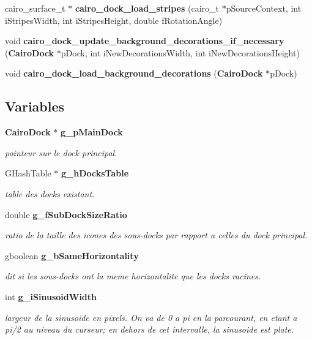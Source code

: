 \begin{CompactItemize}
\item 
cairo\_\-surface\_\-t $\ast$ {\bf cairo\_\-dock\_\-load\_\-stripes} (cairo\_\-t $\ast$p\-Source\-Context, int i\-Stripes\-Width, int i\-Stripes\-Height, double f\-Rotation\-Angle)
\item 
void {\bf cairo\_\-dock\_\-update\_\-background\_\-decorations\_\-if\_\-necessary} ({\bf Cairo\-Dock} $\ast$p\-Dock, int i\-New\-Decorations\-Width, int i\-New\-Decorations\-Height)
\item 
void {\bf cairo\_\-dock\_\-load\_\-background\_\-decorations} ({\bf Cairo\-Dock} $\ast$p\-Dock)
\end{CompactItemize}
\subsection*{Variables}
\begin{CompactItemize}
\item 
{\bf Cairo\-Dock} $\ast$ {\bf g\_\-p\-Main\-Dock}
\begin{CompactList}\small\item\em pointeur sur le dock principal. \item\end{CompactList}\item 
GHash\-Table $\ast$ {\bf g\_\-h\-Docks\-Table}
\begin{CompactList}\small\item\em table des docks existant. \item\end{CompactList}\item 
double {\bf g\_\-f\-Sub\-Dock\-Size\-Ratio}
\begin{CompactList}\small\item\em ratio de la taille des icones des sous-docks par rapport a celles du dock principal. \item\end{CompactList}\item 
gboolean {\bf g\_\-b\-Same\-Horizontality}
\begin{CompactList}\small\item\em dit si les sous-docks ont la meme horizontalite que les docks racines. \item\end{CompactList}\item 
int {\bf g\_\-i\-Sinusoid\-Width}
\begin{CompactList}\small\item\em largeur de la sinusoide en pixels. On va de 0 a pi en la parcourant, en etant a pi/2 au niveau du curseur; en dehors de cet intervalle, la sinusoide est plate. \item\end{CompactList}\item 

\end{CompactItemize}
